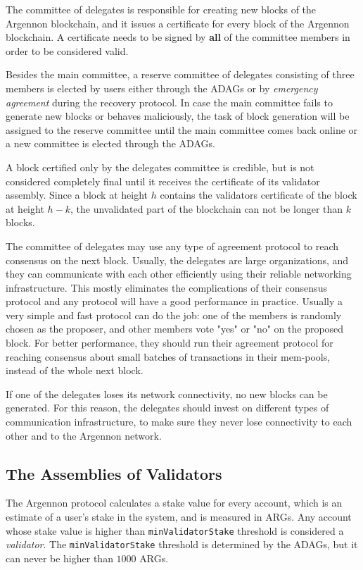 The committee of delegates is responsible for creating new blocks of the Argennon blockchain, and it issues a
certificate for every block of the Argennon blockchain. A certificate needs to be signed
by \textbf{all} of the committee members in order to be considered valid.

Besides the main committee, a reserve committee of delegates consisting of three members is elected by users
either through the ADAGs or by \emph{emergency agreement} during the recovery protocol. In case the main committee
fails to generate new blocks or behaves maliciously, the task of
block generation will be assigned to the reserve committee until the main committee comes back online or a new
committee is elected through the ADAGs.

A block certified only by the delegates committee is credible, but is not considered completely final until it
receives the certificate of its validator assembly. Since a block at height $h$ contains the validators certificate
of the block at height $h-k$, the unvalidated part of the blockchain can not be longer than $k$ blocks.

The committee of delegates may use any type of agreement protocol to reach consensus on the
next block. Usually, the delegates are large organizations, and they can communicate with each
other efficiently using their reliable networking infrastructure. This mostly eliminates the complications of their
consensus protocol and any protocol will have a good performance in practice. Usually a very simple and fast protocol
can do the job: one of the members is randomly chosen as the proposer, and other members vote "yes" or "no" on the
proposed block. For better performance, they should run their agreement protocol for reaching consensus about small
batches of transactions in their mem-pools, instead of the whole next block.

If one of the delegates loses its network connectivity, no new blocks can be generated. For this reason,
the delegates should invest on different types of communication infrastructure, to make sure they never lose
connectivity to each other and to the Argennon network.

\subsection{The Assemblies of Validators}\label{subsec:validators-committee}

The Argennon protocol calculates a stake value for every account, which is an estimate of a user's stake in the
system, and is measured in ARGs. Any account whose stake value is higher than
\texttt{minValidatorStake} threshold is considered a \emph{validator}.
The \texttt{minValidatorStake}
threshold is determined by the ADAGs, but it can never be higher than $1000$ ARGs.

